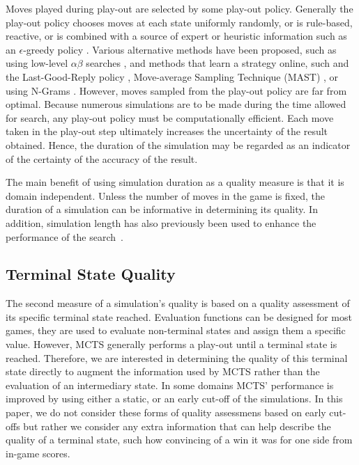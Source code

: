 \documentclass{ecai2014}
\begin{document}
Moves played during play-out are selected by some play-out policy. Generally the play-out policy chooses moves at each state uniformly randomly, or is rule-based, reactive, or is combined with a source of expert or heuristic information such as an $\epsilon$-greedy policy \cite{sturtevant2008analysis, sutton1998reinforcement}. Various alternative methods have been proposed, such as using low-level $\alpha\beta$ searches \cite{Winands2011}, and methods that learn a strategy online, such and the Last-Good-Reply policy \cite{baier2010power}, Move-average Sampling Technique (MAST) \cite{finnsson2008simulation}, or using N-Grams \cite{Tak2012}. However, moves sampled from the play-out policy are far from optimal. Because numerous simulations are to be made during the time allowed for search, any play-out policy must be computationally efficient. Each move taken in the play-out step ultimately increases the uncertainty of the result obtained. Hence, the duration of the simulation may be regarded as an indicator of the certainty of the accuracy of the result.

The main benefit of using simulation duration as a quality measure is that it is domain independent. Unless the number of moves in the game is fixed, the duration of a simulation can be informative in determining its quality. In addition, simulation length has also previously been used to enhance the performance of the search~\cite{roschke2013cc,keller13thts}.

\subsection{Terminal State Quality}
\label{sub:termqual}
The second measure of a simulation's quality is based on a quality assessment of its specific terminal state reached. Evaluation functions can be designed for most games, they are used to evaluate non-terminal states and assign them a specific value. However, MCTS generally performs a play-out until a terminal state is reached. Therefore, we are interested in determining the quality of this terminal state directly to augment the information used by MCTS rather than the evaluation of an intermediary state. In some domains MCTS' performance is improved by using either a static, or an early cut-off of the simulations. In this paper, we do not consider these forms of quality assessmens based on early cut-offs but rather we consider any extra information that can help describe the quality of a terminal state, such how convincing of a win it was for one side from in-game scores. 
\end{document}

